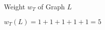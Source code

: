 \documentclass{beamer}
\newcommand{\graphbox}[8]{
  \begin{scope}[xshift=#2,yshift=#3]
    \draw [rounded corners=2mm] (0,0) rectangle (#4,-#5);
    \node at (0,0mm) [anchor=north west,inner sep=1mm] {#1};
    \begin{scope}[xshift=#4/2+#6,yshift=#7] 
    #8
    \end{scope}
  \end{scope}
}
\begin{document}
\begin{frame}{Weight $w_T$ of Graph $L$}
      
      $w_T(L) = 1 + 1 + 1 + 1 + 1 = 5$
\end{frame}
\end{document}

